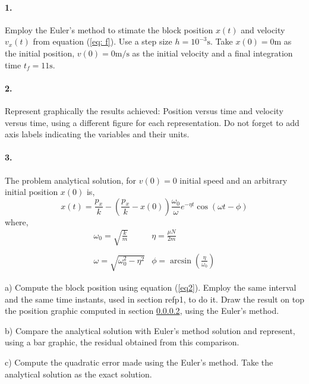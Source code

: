 \paragraph{1.} \label{p1} Employ the Euler's method to stimate the block position $x(t)$ and velocity $v_x(t)$ from equation (\ref{eq: f}). Use a step size $h = 10^{-3}\text{s}$. Take $x(0) = 0\text{m}$ as the initial position, $v(0) = 0\text{m/s}$ as the initial velocity and a final integration time $t_{f}=11\text{s}$.

\paragraph{2.} \label{p2} Represent graphically the results achieved: Position versus time and velocity versus time, using a different figure for each representation. Do not forget to add axis labels indicating the variables and their units.	 

\paragraph{3.} The problem analytical solution, for $v(0)=0$ initial speed and an arbitrary initial position $x(0)$ is, 
\begin{equation}\label{eq2}
	x(t) = \frac{p_x}{k}-\left(\frac{p_x}{k}-x(0)\right)\frac{\omega_0}{\omega}e^{-\eta t}\cos\left(\omega t-\phi \right)
\end{equation}
where,
\begin{equation}
\begin{matrix}
\omega_0 = \sqrt{\frac{k}{m}} & \eta = \frac{\mu N}{2m}\\
\ & \ \\
\omega = \sqrt{\omega_0^2 -\eta^2} &
\phi = \arcsin \left(\frac{\eta}{\omega_0}\right)
\end{matrix} \nonumber
\end{equation}

a) Compute the block position using equation (\ref{eq2}). Employ the same interval and the same time instants, used in section ref{p1}, to do it. Draw the result on top the position graphic computed in section \ref{p2}, using the Euler's method.

b) Compare the analytical solution with Euler's method solution and represent, using a bar graphic, the residual obtained from this comparison.

c) Compute the quadratic error made using the Euler's method. Take the analytical solution as the exact solution.  

